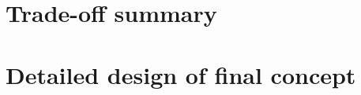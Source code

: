 \chapter{Trade-off summary}   
\label{Interfacedefinition}


\chapter{Detailed design of final concept}